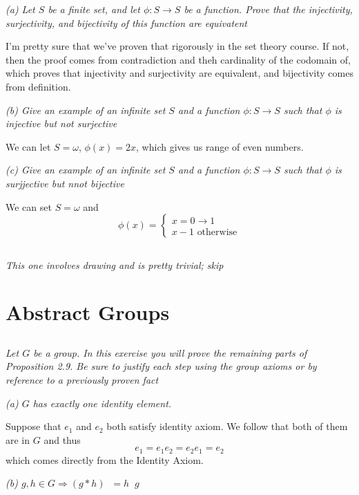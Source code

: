 \documentclass[11pt,oneside,titlepage]{book}
\DeclareMathOperator \inv {^{-1}}
\DeclareMathOperator \ra {\Rightarrow}
\begin{document}
\textit{(a) Let $S$ be a finite set, and let $\phi: S \to S$ be a
function. Prove that the injectivity, surjectivity, and bijectivity of
this function are equivatent}

I'm pretty sure that we've proven that rigorously in the set theory
course. If not, then the proof comes from contradiction and theh
cardinality of the codomain of, which proves that injectivity and
surjectivity are equivalent, and bijectivity comes from definition.

\textit{(b) Give an example of an infinite set $S$ and a function
$\phi: S \to S$ such that $\phi$ is injective but not surjective}

We can let $S = \omega$, $\phi(x) = 2x$, which gives us range of even
numbers.

\textit{(c) Give an example of an infinite set $S$ and a function
$\phi: S \to S$ such that $\phi$ is surjjective but nnot bijective}

We can set $S = \omega$ and
$$\phi(x) =
\begin{cases} x = 0 \to 1 \\ x - 1 \text{ otherwise}
\end{cases}
$$

\subsection{}

\textit{This one involves drawing and is pretty trivial; skip}

\section{Abstract Groups}


\subsection{}

\textit{Let $G$ be a group. In this exercise you will prove the
remaining parts of Proposition 2.9. Be sure to justify each step using
the group axioms or by reference to a previously proven fact}

\textit{(a) $G$ has exactly one identity element.}

Suppose that $e_1$ and $e_2$ both satisfy identity axiom. We follow
that both of them are in $G$ and thus
$$e_1 = e_1 e_2 = e_2 e_1 = e_2$$
which comes directly from the Identity Axiom.

\textit{(b) $g, h \in G \ra (g * h)\inv = h\inv g\inv$}
\end{document}
